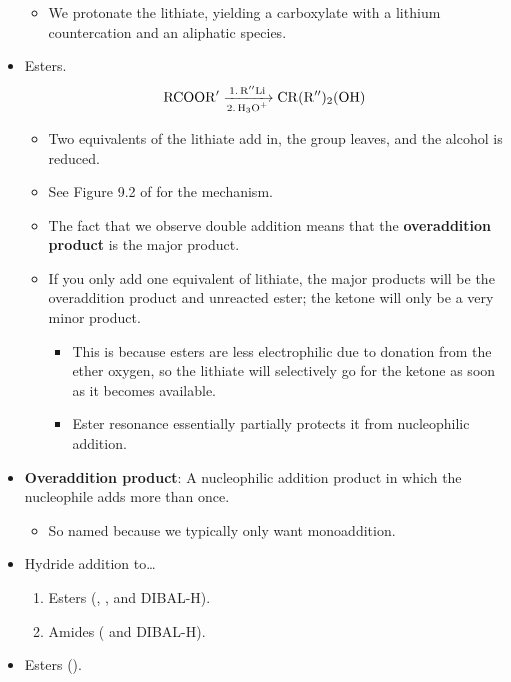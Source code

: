 \documentclass[../notes.tex]{subfiles}
\begin{document}
\begin{itemize}
    \begin{itemize}
        \item We protonate the lithiate, yielding a carboxylate with a lithium countercation and an aliphatic species.
    \end{itemize}
    \item Esters.
    \begin{equation*}
        \ce{RCOOR$'$ ->[1. R$''$Li][2. H3O+] CR(R$''$)2(OH)}
    \end{equation*}
    \begin{itemize}
        \item Two equivalents of the lithiate add in, the  group leaves, and the alcohol is reduced.
        \item See Figure 9.2 of \textcite{bib:CHEM22100Notes} for the mechanism.
        \item The fact that we observe double addition means that the \textbf{overaddition product} is the major product. 
        \item If you only add one equivalent of lithiate, the major products will be the overaddition product and unreacted ester; the ketone will only be a very minor product.
        \begin{itemize}
            \item This is because esters are less electrophilic due to donation from the ether oxygen, so the lithiate will selectively go for the ketone as soon as it becomes available.
            \item Ester resonance essentially partially protects it from nucleophilic addition.
        \end{itemize}
    \end{itemize}
    \item \textbf{Overaddition product}: A nucleophilic addition product in which the nucleophile adds more than once.
    \begin{itemize}
        \item So named because we typically only want monoaddition.
    \end{itemize}
    \item Hydride addition to\dots
    \begin{enumerate}
        \item Esters (, , and DIBAL-H).
        \item Amides ( and DIBAL-H).
    \end{enumerate}
    \item Esters ().

\end{itemize}
\end{document}
